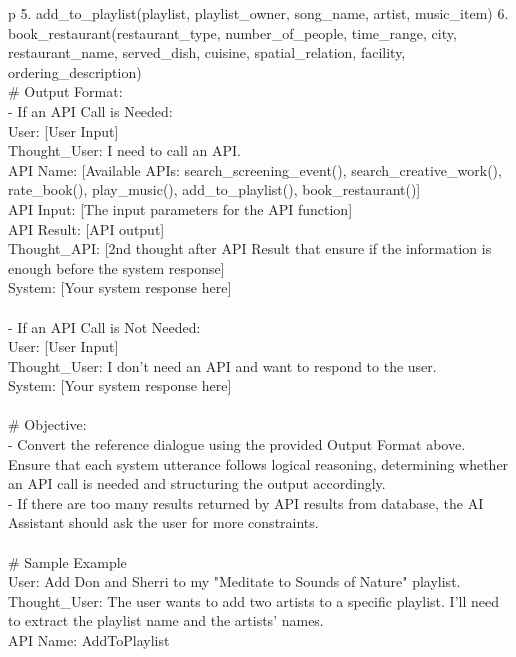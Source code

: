 \begin{table*}
\begin{tabular}{p\linewidth}
5. add\_to\_playlist(playlist, playlist\_owner, song\_name, artist, music\_item)
6. book\_restaurant(restaurant\_type, number\_of\_people, time\_range, city, restaurant\_name, served\_dish, cuisine, spatial\_relation, facility, ordering\_description)
 \\
\# Output Format: \\
- If an API Call is Needed: \\
\quad	User: [User Input] \\
\quad    Thought\_User: I need to call an API. \\
\quad    API Name: [Available APIs: search\_screening\_event(), search\_creative\_work(), rate\_book(), play\_music(), add\_to\_playlist(), book\_restaurant()] \\
\quad    API Input: [The input parameters for the API function] \\
 \quad   API Result: [API output] \\
 \quad   Thought\_API: [2nd thought after API Result that ensure if the information is enough before the system response] \\
\quad	System: [Your system response here] \\
 \\
- If an API Call is Not Needed: \\
\quad	User: [User Input] \\
 \quad   Thought\_User: I don't need an API and want to respond to the user. \\
 \quad   System: [Your system response here] \\
 \\
\# Objective:  \\
- Convert the reference dialogue using the provided Output Format above. Ensure that each system utterance follows logical reasoning, determining whether an API call is needed and structuring the output accordingly. \\
- If there are too many results returned by API results from database, the AI Assistant should ask the user for more constraints. \\
 \\
\# Sample Example \\
User: Add Don and Sherri to my "Meditate to Sounds of Nature" playlist.   \\
Thought\_User: The user wants to add two artists to a specific playlist. I'll need to extract the playlist name and the artists' names.   \\
API Name: AddToPlaylist   \\

\end{tabular}
\end{table*}
